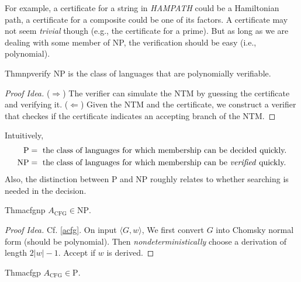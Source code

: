 For example, a certificate for a string in \textit{HAMPATH} could be a Hamiltonian path, a certificate for a composite could be one of its factors. A certificate may not seem \textit{trivial} though (e.g., the certificate for a prime). But as long as we are dealing with some member of NP, the verification should be easy (i.e., polynomial).

\begin{reference}{Thm}{npverify}
  NP is the class of languages that are polynomially verifiable.
\end{reference}

\begin{proof}[Proof Idea]
  ($\Rightarrow$) The verifier can simulate the NTM by guessing the certificate and verifying it.\newline
  ($\Leftarrow$) Given the NTM and the certificate, we construct a verifier that checkes if the certificate indicates an accepting branch of the NTM.
\end{proof}

Intuitively,
\begin{align*}
  \mathrm{P}  & =\text{ the class of languages for which membership can be decided quickly.}           \\
  \mathrm{NP} & =\text{ the class of languages for which membership can be \textit{verified} quickly.}
\end{align*}
Also, the distinction between P and NP roughly relates to whether searching is needed in the decision.

\begin{reference}{Thm}{acfgnp}
  $A_{\mathrm{CFG}}\in \mathrm{NP}$.
\end{reference}

\begin{proof}[Proof Idea]
  Cf. \ref{acfg}. On input $\langle G,w\rangle$, We first convert $G$ into Chomsky normal form (should be polynomial). Then \textit{nondeterministically} choose a derivation of length $2|w|-1$. Accept if $w$ is derived.
\end{proof}

\begin{reference}{Thm}{acfgp}
  $A_{\mathrm{CFG}}\in \mathrm{P}$.
\end{reference}

